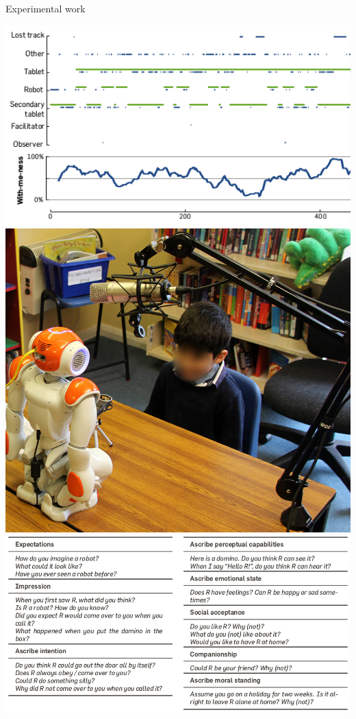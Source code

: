 \documentclass[compress]{beamer}
\begin{document}
\begin{frame}{Experimental work}
            \hyperlink{withmeness}{\includegraphics[height=0.2\paperheight]{withmeness/withmeness}}
            \hspace{0.5em}
            \hyperlink{asr}{\includegraphics[height=0.2\paperheight]{speech-reco/record_img}}
            \hspace{0.5em}
            \hyperlink{constructs}{\includegraphics[height=0.2\paperheight]{ranger/questionnaire}}

\end{frame}
\end{document}
